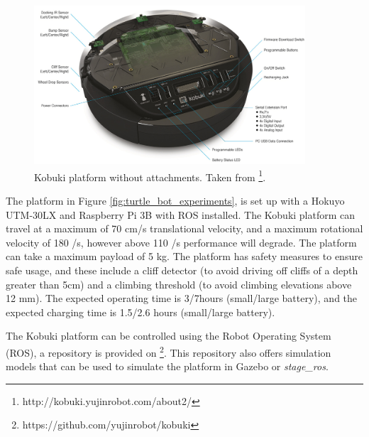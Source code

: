 \begin{figure}[H]
    \centering
    \includegraphics[width=0.9\textwidth]{figs/Kuboki_Platform.png}
    \caption[Kobuki platform]{Kobuki platform without attachments. Taken from \footnote{http://kobuki.yujinrobot.com/about2/}.}
    \label{fig:kuboki-platform} 
\end{figure}

The platform in Figure \ref{fig:turtle_bot_experiments}, is set up with a Hokuyo UTM-30LX and Raspberry Pi 3B with ROS installed. The Kobuki platform can travel at a maximum of 70 cm/s translational velocity, and a maximum rotational velocity of 180 \degree/s, however above 110 \degree/s performance will degrade. The platform can take a maximum payload of 5 kg. The platform has safety measures to ensure safe usage, and these include a cliff detector (to avoid driving off cliffs of a depth greater than 5cm) and a climbing threshold (to avoid climbing elevations above 12 mm). The expected operating time is 3/7hours (small/large battery), and the expected charging time is 1.5/2.6 hours (small/large battery). 

The Kobuki platform can be controlled using the Robot Operating System (ROS), a repository is provided on \footnote{https://github.com/yujinrobot/kobuki}. This repository also offers simulation models that can be used to simulate the platform in Gazebo or \textit{stage\_ros}.


